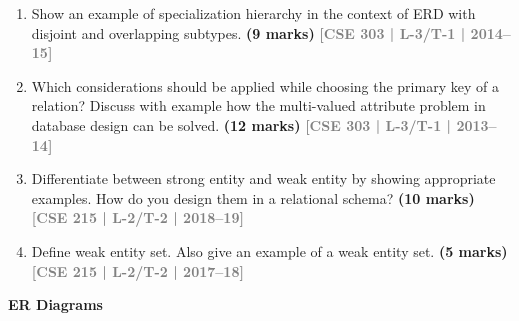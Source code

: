 \documentclass[12pt,a3paper]{article}
\newcommand{\yr}[1]{\hfill\textcolor{gray}{\small\textbf{[#1]}}}
\newcommand{\mk}[1]{\textcolor{orange!70!black}{\small\textbf{(#1 marks)}}}
\newcommand{\subtopic}[2]{%
  \vspace{10pt}
  \noindent\begin{tcolorbox}[colback=#1!8,colframe=#1,boxrule=0.6pt,arc=4pt,
    left=6pt,right=6pt,top=4pt,bottom=4pt]
    \small\bfseries\textcolor{#1}{#2}
  \end{tcolorbox}
  \vspace{2pt}
}
\begin{document}
\begin{enumerate}
Draw an Entity-Relationship (ER) diagram to represent the data requirements described above.
\mk{18} \yr{CSE 303 | L-3/T-1 | 2014--15}

\item Show an example of specialization hierarchy in the context of ERD with disjoint and overlapping subtypes.
\mk{9} \yr{CSE 303 | L-3/T-1 | 2014--15}

\item Which considerations should be applied while choosing the primary key of a relation? Discuss with example how the multi-valued attribute problem in database design can be solved.
\mk{12} \yr{CSE 303 | L-3/T-1 | 2013--14}

\item Differentiate between strong entity and weak entity by showing appropriate examples. How do you design them in a relational schema?
\mk{10} \yr{CSE 215 | L-2/T-2 | 2018--19}

\item Define weak entity set. Also give an example of a weak entity set.
\mk{5} \yr{CSE 215 | L-2/T-2 | 2017--18}

\end{enumerate}

\subtopic{cA}{ER Diagrams}
\label{sub:s2-erdiag}
\end{document}
